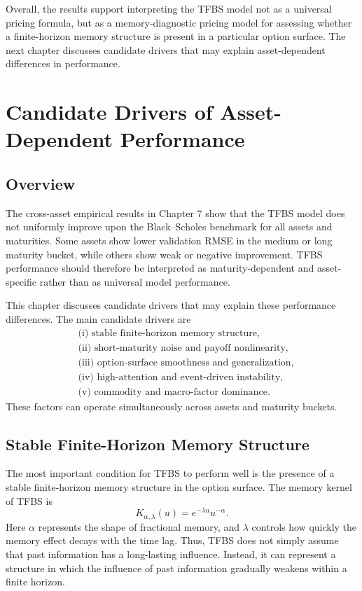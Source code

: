 \documentclass[11pt,a4paper]{report}
\begin{document}
Overall, the results support interpreting the TFBS model not as a universal pricing formula, but as a memory-diagnostic pricing model for assessing whether a finite-horizon memory structure is present in a particular option surface. The next chapter discusses candidate drivers that may explain asset-dependent differences in performance.


\chapter{Candidate Drivers of Asset-Dependent Performance}

\section{Overview}

The cross-asset empirical results in Chapter 7 show that the TFBS model does not uniformly improve upon the Black--Scholes benchmark for all assets and maturities. Some assets show lower validation RMSE in the medium or long maturity bucket, while others show weak or negative improvement. TFBS performance should therefore be interpreted as maturity-dependent and asset-specific rather than as universal model performance.

This chapter discusses candidate drivers that may explain these performance differences. The main candidate drivers are
\[
\begin{aligned}
&\text{(i) stable finite-horizon memory structure},\\
&\text{(ii) short-maturity noise and payoff nonlinearity},\\
&\text{(iii) option-surface smoothness and generalization},\\
&\text{(iv) high-attention and event-driven instability},\\
&\text{(v) commodity and macro-factor dominance}.
\end{aligned}
\]
These factors can operate simultaneously across assets and maturity buckets.

\section{Stable Finite-Horizon Memory Structure}

The most important condition for TFBS to perform well is the presence of a stable finite-horizon memory structure in the option surface. The memory kernel of TFBS is
\[
K_{\alpha,\lambda}(u)
=
e^{-\lambda u}u^{-\alpha}.
\]
Here $\alpha$ represents the shape of fractional memory, and $\lambda$ controls how quickly the memory effect decays with the time lag. Thus, TFBS does not simply assume that past information has a long-lasting influence. Instead, it can represent a structure in which the influence of past information gradually weakens within a finite horizon.
\end{document}
